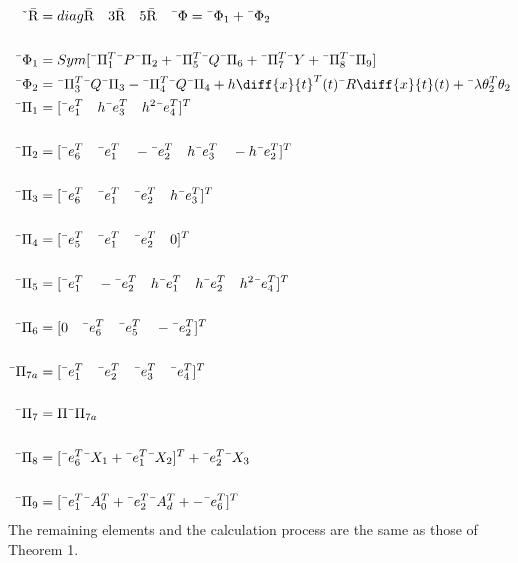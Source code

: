 \documentclass[journal]{IEEEtran}
\begin{document}
\begin{align}
\text{\~{\={R}}} &= diag{\text{\={R}} \quad 3\text{\={R}} \quad 5\text{\={R}}} \quad \text{\={$\Phi$}} = \text{\={$\Phi_1$}} + \text{\={$\Phi_2$}} \\ \\
\text{\={$\Phi_1$}}& = Sym[\text{\={$\Pi^{T}_{1}$}}\text{\={$P$}}\text{\={$\Pi_2$}} + \text{\={$\Pi^{T}_{5}$}}\text{\={$Q$}}\text{\={$\Pi_{6}$}} + \text{\={$\Pi^{T}_{7}$}}\text{\={$Y$}} + \text{\={$\Pi^{T}_{8}$}}\text{\={$\Pi_{9}$}}] \\ 
\text{\={$\Phi_{2}$}}& = \text{\={$\Pi^{T}_{3}$}}\text{\={$Q$}}\text{\={$\Pi_{3}$}} - \text{\={$\Pi^{T}_{4}$}}\text{\={$Q$}}\text{\={$\Pi_{4}$}} + h\diff{x}{t}^T(t)\text{\={$R$}}\diff{x}{t}(t) + \text{\={$\lambda$}}\theta^{T}_{2}\theta_2 \\ 
\text{\={$\Pi_{1}$}} &= [\text{\={$e^{T}_{1}$}} \quad h\text{\={$e^{T}_{3}$}} \quad h^2\text{\={$e^{T}_{4}$}}]^T \\ \\
\text{\={$\Pi_{2}$}} &= [\text{\={$e^{T}_{6}$}} \quad \text{\={$e^{T}_{1}$}} \quad -\text{\={$e^{T}_{2}$}} \quad h\text{\={$e^{T}_{3}$}} \quad -h\text{\={$e^{T}_{2}$}} ]^T \\ \\ 
\text{\={$\Pi_{3}$}} &= [\text{\={$e^{T}_{6}$}} \quad \text{\={$e^{T}_{1}$}} \quad \text{\={$e^{T}_{2}$}} \quad h\text{\={$e^{T}_{3}$}}]^T \\ \\
\text{\={$\Pi_{4}$}} &= [\text{\={$e^{T}_{5}$}} \quad \text{\={$e^{T}_{1}$}} \quad \text{\={$e^{T}_{2}$}} \quad 0]^T \\ \\
\text{\={$\Pi_{5}$}} &= [\text{\={$e^{T}_{1}$}} \quad -\text{\={$e^{T}_{2}$}} \quad h\text{\={$e^{T}_{1}$}} \quad h\text{\={$e^{T}_{2}$}} \quad h^2\text{\={$e^{T}_{4}$}}]^T \\ \\
\text{\={$\Pi_{6}$}} &= [0 \quad \text{\={$e^{T}_{6}$}} \quad \text{\={$e^{T}_{5}$}} \quad -\text{\={$e^{T}_{2}$}}]^T \\ \\
\text{\={$\Pi_{7a}$}} &= [\text{\={$e^{T}_{1}$}} \quad \text{\={$e^{T}_{2}$}} \quad \text{\={$e^{T}_{3}$}} \quad \text{\={$e^{T}_{4}$}}]^T \\ \\
\text{\={$\Pi_{7}$}} &= \Pi\text{\={$\Pi_{7a}$}} \\ \\
\text{\={$\Pi_{8}$}} &= [\text{\={$e^{T}_{6}$}}\text{\={$X_{1}$}} + \text{\={$e^{T}_{1}$}}\text{\={$X_{2}$}}]^T + \text{\={$e^{T}_{2}$}}\text{\={$X_{3}$}} \\ \\
\text{\={$\Pi_{9}$}} &= [\text{\={$e^{T}_{1}$}}\text{\={$A^{T}_{0}$}} + \text{\={$e^{T}_{2}$}}\text{\={$A^{T}_{d}$}} + -\text{\={$e^{T}_{6}$}}]^T \\
\end{align}
The remaining elements and the calculation process are the same as those of Theorem 1.
\end{document}
